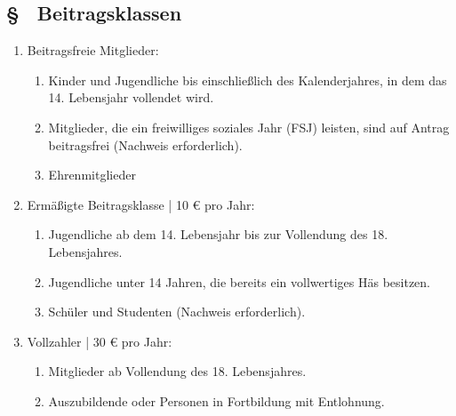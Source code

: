 \subsection{§ \theboparagraphcounter\ Beitragsklassen} \label{bo:par:beitragsklassen}
\begin{enumerate}
    \item \label{bo:abs:3luqnl} Beitragsfreie Mitglieder:
    \begin{enumerate}
        \item Kinder und Jugendliche bis einschließlich des Kalenderjahres, in dem das 14. Lebensjahr vollendet wird.
        
        \item Mitglieder, die ein freiwilliges soziales Jahr (FSJ) leisten, sind auf Antrag beitragsfrei (Nachweis erforderlich).

        \item Ehrenmitglieder
    \end{enumerate}

    \item \label{bo:abs:5o2nie} Ermäßigte Beitragsklasse | 10 € pro Jahr:
    \begin{enumerate}
        \item Jugendliche ab dem 14. Lebensjahr bis zur Vollendung des 18. Lebensjahres.

        \item Jugendliche unter 14 Jahren, die bereits ein vollwertiges Häs besitzen.
        
        \item Schüler und Studenten (Nachweis erforderlich).
    \end{enumerate}

    \item \label{bo:abs:ofkmx8} Vollzahler | 30 € pro Jahr:
    \begin{enumerate}
        \item Mitglieder ab Vollendung des 18. Lebensjahres.
        
        \item Auszubildende oder Personen in Fortbildung mit Entlohnung.
    \end{enumerate}
\end{enumerate}

